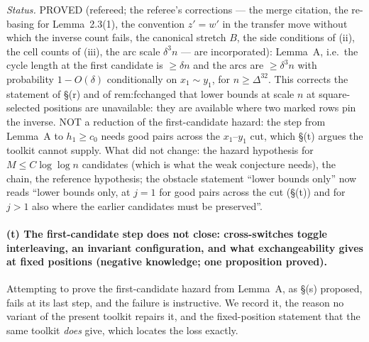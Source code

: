 \emph{Status.}  PROVED (refereed; the referee's corrections --- the merge
citation, the re-basing for Lemma~2.3(1), the convention $z'=w'$ in
the transfer move without which the inverse count fails, the canonical
stretch $B$, the side conditions of (ii), the cell counts of (iii),
the arc scale $\delta^3n$ --- are incorporated): Lemma~A, i.e.\ the
cycle length at the first candidate is $\ge\delta n$ and the arcs are
$\ge\delta^3n$ with probability $1-O(\delta)$ conditionally on
$x_1\sim y_1$, for $n\ge\Delta^{32}$.  This
corrects the statement of \S(r) and of rem:fcchanged that lower bounds
at scale $n$ at square-selected positions are unavailable: they are
available where two marked rows pin the inverse.  NOT a reduction of the
first-candidate hazard: the step from Lemma~A to $h_1\ge c_0$ needs
good pairs across the $x_1$--$y_1$ cut, which \S(t) argues the toolkit
cannot supply.  What did not change: the hazard hypothesis for $M\le C\log\log n$
candidates (which is what the weak conjecture needs), the chain, the
reference hypothesis; the obstacle statement ``lower bounds only'' now
reads ``lower bounds only, at $j=1$ for good pairs across the cut
(\S(t)) and for $j>1$ also where the earlier candidates
must be preserved''.

\paragraph{(t) The first-candidate step does not close: cross-switches
toggle interleaving, an invariant configuration, and what
exchangeability gives at fixed positions (negative knowledge; one
proposition proved).}
Attempting to prove the first-candidate hazard from Lemma~A, as
\S(s) proposed, fails at its last step, and the failure is
instructive.  We record it, the reason no variant of the present
toolkit repairs it, and the fixed-position statement that the same
toolkit \emph{does} give, which locates the loss exactly.


